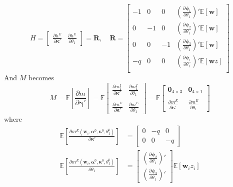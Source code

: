 \documentclass[12pt]{article}
\begin{document}
\[
  H = \left[
  \begin{array}{cc}
    \displaystyle \frac{\partial h^E}{\partial \boldsymbol{\kappa}'} &
    \displaystyle \frac{\partial h^E}{\partial \theta_1}
  \end{array}
\right] = \mathbf{R}, \quad \mathbf{R} = \left[
\begin{array}{rrrr}
  -1 & 0 & 0 
  & \displaystyle \left(\frac{\partial \boldsymbol{\psi}_1}{\partial \theta_1}\right)'\mathbb{E}[\mathbf{w}]\\
   0 & -1 & 0 & \displaystyle \left(\frac{\partial \boldsymbol{\psi}_2}{\partial \theta_1}\right)'\mathbb{E}[\mathbf{w}]\\
   0 & 0 & -1 & \displaystyle \left(\frac{\partial \boldsymbol{\psi}_3}{\partial \theta_1}\right)'\mathbb{E}[\mathbf{w}]\\
   -q & 0 & 0 &  \displaystyle \left(\frac{\partial \boldsymbol{\psi}_1}{\partial \theta_1}\right)'\mathbb{E}[\mathbf{w}z]\\
\end{array}
\right]
\]
And $M$ becomes
\[
  M = \mathbb{E}\left[ \frac{\partial m}{\partial \boldsymbol{\gamma}'}  \right]= 
  \mathbb{E}\left[
  \begin{array}{rr}
    \displaystyle \frac{\partial m^I_1}{\partial \boldsymbol{\kappa}'} &
    \displaystyle \frac{\partial m^I_1}{\partial \theta_1}\\ \\
    \displaystyle \frac{\partial m^E}{\partial \boldsymbol{\kappa}'} &
    \displaystyle \frac{\partial m^E}{\partial \theta_1}
  \end{array}
\right]  =
  \mathbb{E}\left[
  \begin{array}{rr}

    \mathbf{0}_{4\times 3} & \mathbf{0}_{4\times 1}\\ \\
    \displaystyle \frac{\partial m^E}{\partial \boldsymbol{\kappa}'} &
    \displaystyle \frac{\partial m^E}{\partial \theta_1}
  \end{array}
\right] 
\]
where
\begin{align*}
\mathbb{E}\left[\frac{\partial m^E\left( \mathbf{w}_i, \boldsymbol{\alpha}^0,  \boldsymbol{\kappa}^0, \theta_1^0 \right)}{\partial \boldsymbol{\kappa}'}\right] &= \left[
\begin{array}{ccc}
  0 & -q & 0 \\
  0 & 0 & -q
\end{array}
\right]\\ 
\mathbb{E}\left[\frac{\partial m^E\left( \mathbf{w}_i, \boldsymbol{\alpha}^0,  \boldsymbol{\kappa}^0, \theta_1^0 \right)}{\partial \theta_1}\right] &=
\left[
\begin{array}{c}
  \displaystyle\left( \frac{\partial \boldsymbol{\psi}_2}{\partial \theta_1} \right)'\\ 
  \displaystyle\left( \frac{\partial \boldsymbol{\psi}_3}{\partial \theta_1} \right)' 
\end{array}
\right] \mathbb{E}[\mathbf{w}_iz_i]
\end{align*}
\end{document}
